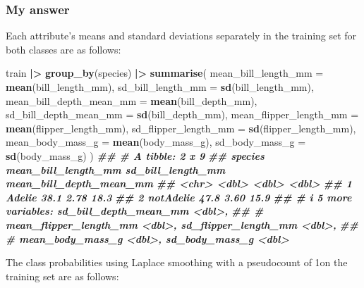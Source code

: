 \documentclass[
]{article}
\newenvironment{Shaded}{\begin{snugshade}}{\end{snugshade}}
\newcommand{\AttributeTok}[1]{\textcolor[rgb]{0.13,0.29,0.53}{#1}}
\newcommand{\DocumentationTok}[1]{\textcolor[rgb]{0.56,0.35,0.01}{\textbf{\textit{#1}}}}
\newcommand{\FunctionTok}[1]{\textcolor[rgb]{0.13,0.29,0.53}{\textbf{#1}}}
\newcommand{\NormalTok}[1]{#1}
\newcommand{\SpecialCharTok}[1]{\textcolor[rgb]{0.81,0.36,0.00}{\textbf{#1}}}
\begin{document}
\hypertarget{my-answer-3}{%
\subsubsection{My answer}\label{my-answer-3}}

Each attribute's means and standard deviations separately in the
training set for both classes are as follows:

\begin{Shaded}
\begin{Highlighting}[]
\NormalTok{train }\SpecialCharTok{|\textgreater{}} 
  \FunctionTok{group\_by}\NormalTok{(species) }\SpecialCharTok{|\textgreater{}} 
  \FunctionTok{summarise}\NormalTok{(}
    \AttributeTok{mean\_bill\_length\_mm =} \FunctionTok{mean}\NormalTok{(bill\_length\_mm),}
    \AttributeTok{sd\_bill\_length\_mm =} \FunctionTok{sd}\NormalTok{(bill\_length\_mm),}
    \AttributeTok{mean\_bill\_depth\_mean\_mm =} \FunctionTok{mean}\NormalTok{(bill\_depth\_mm),}
    \AttributeTok{sd\_bill\_depth\_mean\_mm =} \FunctionTok{sd}\NormalTok{(bill\_depth\_mm),}
    \AttributeTok{mean\_flipper\_length\_mm =} \FunctionTok{mean}\NormalTok{(flipper\_length\_mm),}
    \AttributeTok{sd\_flipper\_length\_mm =} \FunctionTok{sd}\NormalTok{(flipper\_length\_mm),}
    \AttributeTok{mean\_body\_mass\_g =} \FunctionTok{mean}\NormalTok{(body\_mass\_g),}
    \AttributeTok{sd\_body\_mass\_g =} \FunctionTok{sd}\NormalTok{(body\_mass\_g)}
\NormalTok{  )}
\DocumentationTok{\#\# \# A tibble: 2 x 9}
\DocumentationTok{\#\#   species   mean\_bill\_length\_mm sd\_bill\_length\_mm mean\_bill\_depth\_mean\_mm}
\DocumentationTok{\#\#   \textless{}chr\textgreater{}                   \textless{}dbl\textgreater{}             \textless{}dbl\textgreater{}                   \textless{}dbl\textgreater{}}
\DocumentationTok{\#\# 1 Adelie                   38.1              2.78                    18.3}
\DocumentationTok{\#\# 2 notAdelie                47.8              3.60                    15.9}
\DocumentationTok{\#\# \# i 5 more variables: sd\_bill\_depth\_mean\_mm \textless{}dbl\textgreater{},}
\DocumentationTok{\#\# \#   mean\_flipper\_length\_mm \textless{}dbl\textgreater{}, sd\_flipper\_length\_mm \textless{}dbl\textgreater{},}
\DocumentationTok{\#\# \#   mean\_body\_mass\_g \textless{}dbl\textgreater{}, sd\_body\_mass\_g \textless{}dbl\textgreater{}}
\end{Highlighting}
\end{Shaded}

The class probabilities using Laplace smoothing with a pseudocount of
1on the training set are as follows:
\end{document}

